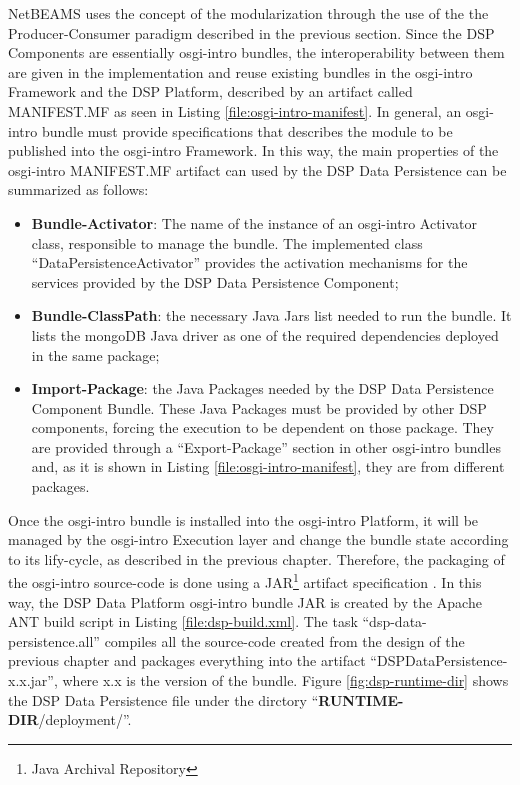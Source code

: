 NetBEAMS uses the concept of the modularization through the use of the the
Producer-Consumer paradigm described in the previous section. Since the DSP
Components are essentially osgi-intro bundles, the interoperability between them are
given in the implementation and reuse existing bundles in the osgi-intro Framework
and the DSP Platform, described by an artifact called MANIFEST.MF as seen in
Listing \ref{file:osgi-intro-manifest}. In general, an osgi-intro bundle must
provide specifications that describes the module to be published into the osgi-intro
Framework. In this way, the main properties of the osgi-intro MANIFEST.MF artifact can
used by the DSP Data Persistence can be summarized as follows:

\begin{itemize}
  \item \textbf{Bundle-Activator}: The name of the instance of an osgi-intro Activator
  class, responsible to manage the bundle. The implemented class
  ``DataPersistenceActivator'' provides the activation mechanisms for the
  services provided by the DSP Data Persistence Component;
  \item \textbf{Bundle-ClassPath}: the necessary Java Jars list needed to run
  the bundle. It lists the mongoDB Java driver as one of the required
  dependencies deployed in the same package;
  \item \textbf{Import-Package}: the Java Packages needed by the DSP Data
  Persistence Component Bundle. These Java Packages must be provided by other
  DSP components, forcing the execution to be dependent on those package.
  They are provided through a ``Export-Package'' section in other osgi-intro
  bundles and, as it is shown in Listing \ref{file:osgi-intro-manifest}, they
  are from different packages.
\end{itemize}

Once the osgi-intro bundle is installed into the osgi-intro Platform, it will be managed by
the osgi-intro Execution layer and change the bundle state according to its
lify-cycle, as described in the previous chapter. Therefore, the packaging of
the osgi-intro source-code is done using a JAR\footnote{Java Archival Repository}
artifact specification \cite{java-tutorial}. In this way, the DSP Data
Platform osgi-intro bundle JAR is created by the Apache ANT build script
\cite{apache-ant} in Listing \ref{file:dsp-build.xml}. The task
``dsp-data-persistence.all'' compiles all the source-code created from the
design of the previous chapter and packages everything into the artifact
``DSPDataPersistence-x.x.jar'', where x.x is the version of the bundle. Figure
\ref{fig:dsp-runtime-dir} shows the DSP Data Persistence file under the
dirctory ``\textbf{RUNTIME-DIR}/deployment/''.

